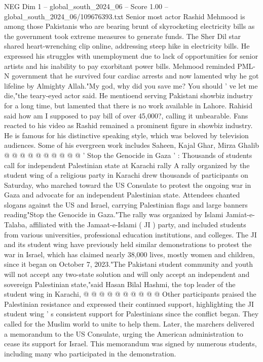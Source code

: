 \begin{textsample}{NEG Dim 1 – global\_south\_2024\_06 – Score 1.00 – global\_south\_2024\_06/109676393.txt}  \label{ex:f1_neg_318}
Senior most actor Rashid Mehmood is among those Pakistanis who are bearing brunt of skyrocketing electricity bills as the government took extreme measures to generate funds.
The Sher Dil star shared heart-wrenching clip online, addressing steep hike in electricity bills.
He expressed his struggles with unemployment due to lack of opportunities for senior artists and his inability to pay exorbitant power bills.
Mehmood reminded PML-N government that he survived four cardiac arrests and now lamented why he got lifeline by Almighty Allah."My god, why did you save me?
You should ' ve let me die,"the teary-eyed actor said.
He mentioend serving Pakistani showbiz industry for a long time, but lamented that there is no work available in Lahore.
Rahisid said how am I supposed to pay bill of over 45,000?, calling it unbearable.
Fans reacted to his video as Rashid remained a prominent figure in showbiz industry.
He is famous for his distinctive speaking style, which was beloved by television audiences.
Some of his evergreen work includes Saheen, Kajal Ghar, Mirza Ghalib @ @ @ @ @ @ @ @ @ @ ' Stop the Genocide in Gaza ' : Thousands of students call for independent Palestinian state at Karachi rally A rally organized by the student wing of a religious party in Karachi drew thousands of participants on Saturday, who marched toward the US Consulate to protest the ongoing war in Gaza and advocate for an independent Palestinian state.
Attendees chanted slogans against the US and Israel, carrying Palestinian flags and large banners reading"Stop the Genocide in Gaza."The rally was organized by Islami Jamiat-e-Talaba, affiliated with the Jamaat-e-Islami ( JI ) party, and included students from various universities, professional education institutions, and colleges.
The JI and its student wing have previously held similar demonstrations to protest the war in Israel, which has claimed nearly 38,000 lives, mostly women and children, since it began on October 7, 2023."The Pakistani student community and youth will not accept any two-state solution and will only accept an independent and sovereign Palestinian state,"said Hasan Bilal Hashmi, the top leader of the student wing in Karachi, @ @ @ @ @ @ @ @ @ @ Other participants praised the Palestinian resistance and expressed their continued support, highlighting the JI student wing ' s consistent support for Palestinians since the conflict began.
They called for the Muslim world to unite to help them.
Later, the marchers delivered a memorandum to the US Consulate, urging the American administration to cease its support for Israel.
This memorandum was signed by numerous students, including many who participated in the demonstration.

\end{textsample}
